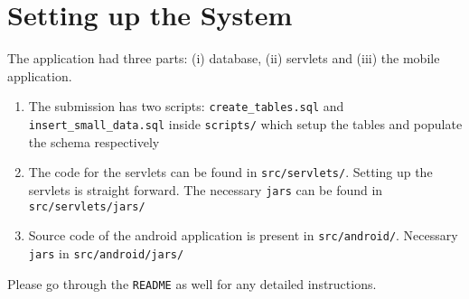 \documentclass[paper=a4, fontsize=11pt]{scrartcl}
\numberwithin{equation}{section}		%
\numberwithin{figure}{section}			%
\numberwithin{table}{section}			%
\begin{document}
\newpage

\section{Setting up the System}
The application had three parts: (i) database, (ii) servlets and (iii) the mobile application.
\begin{enumerate}[i]
	\item The submission has two scripts: \texttt{create\_tables.sql} and \texttt{insert\_small\_data.sql} inside \texttt{scripts/} which setup the tables and populate the schema respectively
	\item The code for the servlets can be found in \texttt{src/servlets/}. Setting up the servlets is straight forward. The necessary \texttt{jars} can be found in \texttt{src/servlets/jars/}
	\item Source code of the android application is present in \texttt{src/android/}. Necessary \texttt{jars} in \texttt{src/android/jars/}
\end{enumerate}
Please go through the \texttt{README} as well for any detailed instructions. 
\end{document}
